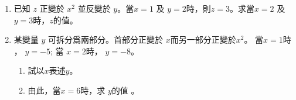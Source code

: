 \documentclass[11pt]{article}
\begin{document}
\begin{enumerate}
        \item 已知 $z$ 正變於 $x^2$ 並反變於 $y$。當$x=1$ 及 $y=2$時，則$z=3$。求當$x=2$ 及 $y=3$時，$z$的值。
        
        \hrulefill

            \hrulefill
            
            \hrulefill
            
            \hrulefill
            
            \hrulefill
            
            \hrulefill
            
            \hrulefill
            
            \hrulefill
            
            \hrulefill
            
            \hrulefill
            
            \hrulefill
            
            \hrulefill

        \pagebreak
        \item 某變量 $y$ 可拆分爲兩部分。首部分正變於 $x$而另一部分正變於$x^2$。 當$x=1$時 ， $y=-5$; 當 $x=2$時， $y=-8$。\begin{enumerate}
            \item 試以$x$表述$y$。
            \item 由此，當$x=6$時，求 $y$的值 。
        \end{enumerate}

        \hrulefill

            \hrulefill
            
            \hrulefill
            
            \hrulefill
            
            \hrulefill
            
            \hrulefill
            
            \hrulefill
            
            \hrulefill
            
            \hrulefill
            
            \hrulefill
            
            \hrulefill
            
            \hrulefill

            \hrulefill

            \hrulefill
            

\end{enumerate}
\end{document}
